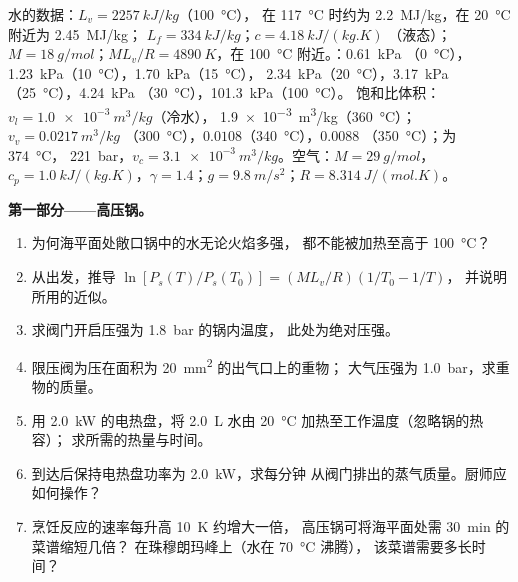 \begin{problem}
\label{pb:b1:phase-changes:1}
水的数据：$L_v = \qty{2257}{kJ/kg}$（\qty{100}{\degreeCelsius}），
在 \qty{117}{\degreeCelsius} 时约为 \qty{2.2}{MJ/kg}，在 \qty{20}{\degreeCelsius} 附近为 \qty{2.45}{MJ/kg}；
$L_f = \qty{334}{kJ/kg}$；$c = \qty{4.18}{kJ/(kg.K)}$
（液态）；$M = \qty{18}{g/mol}$；$ML_v/R = \qty{4890}{K}$，在
\qty{100}{\degreeCelsius} 附近。：\qty{0.61}{kPa}
（\qty{0}{\degreeCelsius}），\qty{1.23}{kPa}（\qty{10}{\degreeCelsius}），\qty{1.70}{kPa}（\qty{15}{\degreeCelsius}），
\qty{2.34}{kPa}（\qty{20}{\degreeCelsius}），\qty{3.17}{kPa}（\qty{25}{\degreeCelsius}），\qty{4.24}{kPa}
（\qty{30}{\degreeCelsius}），\qty{101.3}{kPa}（\qty{100}{\degreeCelsius}）。
饱和比体积：$v_l = \qty{1.0e-3}{m^3/kg}$（冷水），
\qty{1.9e-3}{m^3/kg}（\qty{360}{\degreeCelsius}）；$v_v = \qty{0.0217}{m^3/kg}$
（\qty{300}{\degreeCelsius}），$0.0108$（\qty{340}{\degreeCelsius}），$0.0088$
（\qty{350}{\degreeCelsius}）；为 \qty{374}{\degreeCelsius}，
\qty{221}{bar}，$v_c = \qty{3.1e-3}{m^3/kg}$。空气：$M = \qty{29}{g/mol}$，$c_p =
\qty{1.0}{kJ/(kg.K)}$，$\gamma = 1.4$；$g = \qty{9.8}{m/s^2}$；$R =
\qty{8.314}{J/(mol.K)}$。

\medskip
\noindent\textbf{第一部分——高压锅。}
\begin{enumerate}
  \item 为何海平面处敞口锅中的水无论火焰多强，
        都不能被加热至高于 \qty{100}{\degreeCelsius}？
  \item 从出发，推导
        $\ln[P_s(T)/P_s(T_0)] = (ML_v/R)(1/T_0 - 1/T)$，
        并说明所用的近似。
  \item 求阀门开启压强为 \qty{1.8}{bar} 的锅内温度，
        此处为绝对压强。
  \item 限压阀为压在面积为 \qty{20}{mm^2} 的出气口上的重物；
        大气压强为 \qty{1.0}{bar}，求重物的质量。
  \item 用 \qty{2.0}{kW} 的电热盘，将 \qty{2.0}{L} 水由 \qty{20}{\degreeCelsius}
        加热至工作温度（忽略锅的热容）；
        求所需的热量与时间。
  \item 到达后保持电热盘功率为 \qty{2.0}{kW}，求每分钟
        从阀门排出的蒸气质量。厨师应如何操作？
  \item 烹饪反应的速率每升高 \qty{10}{K} 约增大一倍，
        高压锅可将海平面处需 \qty{30}{min} 的菜谱缩短几倍？
        在珠穆朗玛峰上（水在 \qty{70}{\degreeCelsius} 沸腾），
        该菜谱需要多长时间？
\end{enumerate}


\end{problem}
